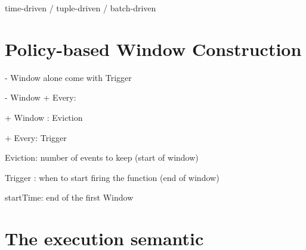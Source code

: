 time-driven / tuple-driven / batch-driven
 

\section{Policy-based Window Construction}

- Window alone come with Trigger

- Window + Every:

+ Window : Eviction

+ Every: Trigger 


Eviction: number of events to keep (start of window)

Trigger : when to start firing the function (end of window)

startTime: end of the first Window

\section{The execution semantic}




